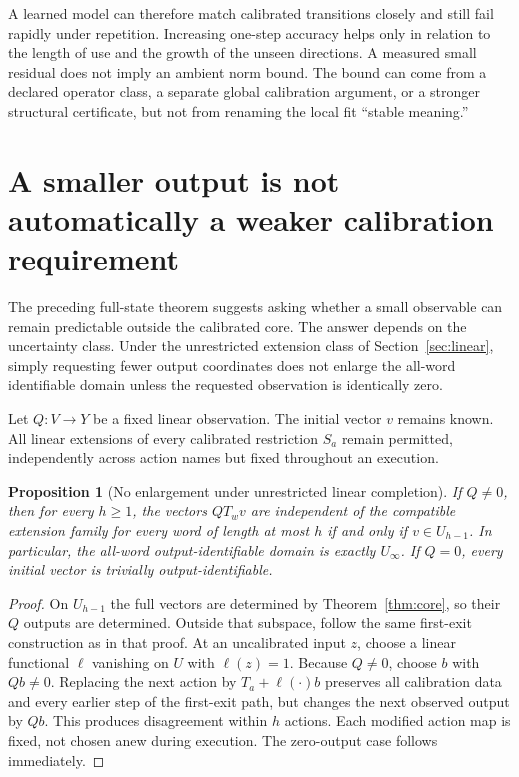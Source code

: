 \documentclass[11pt,letterpaper]{article}
\theoremstyle{plain}
\newtheorem{proposition}[theorem]{Proposition}
\theoremstyle{definition}
\begin{document}
A learned model can therefore match calibrated transitions closely and still fail rapidly under repetition. Increasing one-step accuracy helps only in relation to the length of use and the growth of the unseen directions. A measured small residual does not imply an ambient norm bound. The bound can come from a declared operator class, a separate global calibration argument, or a stronger structural certificate, but not from renaming the local fit ``stable meaning.''

\section{A smaller output is not automatically a weaker calibration requirement}\label{sec:noenlargement}
The preceding full-state theorem suggests asking whether a small observable can remain predictable outside the calibrated core. The answer depends on the uncertainty class. Under the unrestricted extension class of Section~\ref{sec:linear}, simply requesting fewer output coordinates does not enlarge the all-word identifiable domain unless the requested observation is identically zero.

Let $Q:V\to Y$ be a fixed linear observation. The initial vector $v$ remains known. All linear extensions of every calibrated restriction $S_a$ remain permitted, independently across action names but fixed throughout an execution.

\begin{proposition}[No enlargement under unrestricted linear completion]\label{prop:noenlargement}
If $Q\ne0$, then for every $h\ge1$, the vectors $QT_wv$ are independent of the compatible extension family for every word of length at most $h$ if and only if $v\in U_{h-1}$. In particular, the all-word output-identifiable domain is exactly $U_\infty$. If $Q=0$, every initial vector is trivially output-identifiable.
\end{proposition}
\begin{proof}
On $U_{h-1}$ the full vectors are determined by Theorem~\ref{thm:core}, so their $Q$ outputs are determined. Outside that subspace, follow the same first-exit construction as in that proof. At an uncalibrated input $z$, choose a linear functional $\ell$ vanishing on $U$ with $\ell(z)=1$. Because $Q\ne0$, choose $b$ with $Qb\ne0$. Replacing the next action by $T_a+\ell(\cdot)b$ preserves all calibration data and every earlier step of the first-exit path, but changes the next observed output by $Qb$. This produces disagreement within $h$ actions. Each modified action map is fixed, not chosen anew during execution. The zero-output case follows immediately.
\end{proof}
\end{document}
